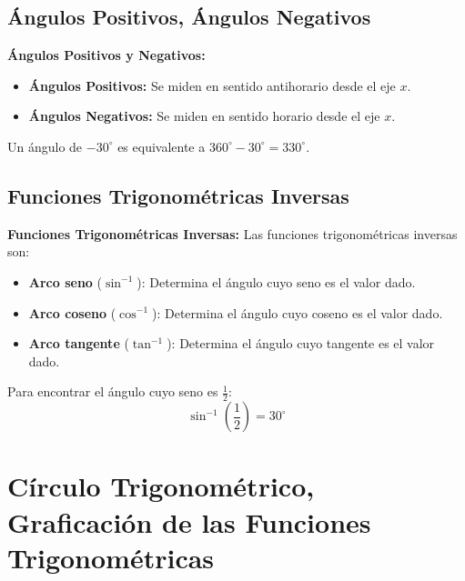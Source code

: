 \subsection{Ángulos Positivos, Ángulos Negativos}

\begin{definition}
    \textbf{Ángulos Positivos y Negativos:} 
    \begin{itemize}
        \item \textbf{Ángulos Positivos:} Se miden en sentido antihorario desde el eje \(x\).
        \item \textbf{Ángulos Negativos:} Se miden en sentido horario desde el eje \(x\).
    \end{itemize}
\end{definition}

\begin{example}
    Un ángulo de \(-30^\circ\) es equivalente a \(360^\circ - 30^\circ = 330^\circ\).
\end{example}

\subsection{Funciones Trigonométricas Inversas}

\begin{definition}
    \textbf{Funciones Trigonométricas Inversas:} Las funciones trigonométricas inversas son:
    \begin{itemize}
        \item \textbf{Arco seno} (\(\sin^{-1}\)): Determina el ángulo cuyo seno es el valor dado.
        \item \textbf{Arco coseno} (\(\cos^{-1}\)): Determina el ángulo cuyo coseno es el valor dado.
        \item \textbf{Arco tangente} (\(\tan^{-1}\)): Determina el ángulo cuyo tangente es el valor dado.
    \end{itemize}
\end{definition}

\begin{example}
    Para encontrar el ángulo cuyo seno es \(\frac{1}{2}\):
    \[
    \sin^{-1}\left(\frac{1}{2}\right) = 30^\circ
    \]
\end{example}


\section{Círculo Trigonométrico, Graficación de las Funciones Trigonométricas} %

